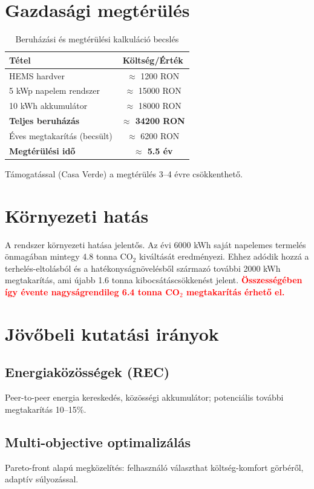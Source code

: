 \section{Gazdasági megtérülés}
\begin{table}[H]
\centering
\caption{Beruházási és megtérülési kalkuláció becslés}
\begin{tabular}{lc}
\toprule
\textbf{Tétel} & \textbf{Költség/Érték} \\
\midrule
HEMS hardver & $\approx$ 1200 RON \\
5 kWp napelem rendszer & $\approx$ 15000 RON \\
10 kWh akkumulátor & $\approx$ 18000 RON \\
\midrule
\textbf{Teljes beruházás} & \textbf{$\approx$ 34200 RON} \\
\midrule
Éves megtakarítás (becsült) & $\approx$ 6200 RON \\
\midrule
\rowcolor{yellow!30}
\textbf{Megtérülési idő} & \textbf{$\approx$ 5.5 év} \\
\bottomrule
\end{tabular}
\end{table}
Támogatással (Casa Verde) a megtérülés 3--4 évre csökkenthető.

\section{Környezeti hatás}
A rendszer környezeti hatása jelentős. Az évi 6000 kWh saját napelemes termelés önmagában mintegy 4.8 tonna CO$_2$ kiváltását eredményezi. Ehhez adódik hozzá a terhelés-eltolásból és a hatékonyságnövelésből származó további 2000 kWh megtakarítás, ami újabb 1.6 tonna kibocsátáscsökkenést jelent. \textcolor{red}{\textbf{Összességében így évente nagyságrendileg 6.4 tonna CO$_2$ megtakarítás érhető el.}}

\section{Jövőbeli kutatási irányok}
\subsection{Energiaközösségek (REC)}
Peer-to-peer energia kereskedés, közösségi akkumulátor; potenciális további megtakarítás 10--15\%.

\subsection{Multi-objective optimalizálás}
Pareto-front alapú megközelítés: felhasználó választhat költség-komfort görbéről, adaptív súlyozással.

